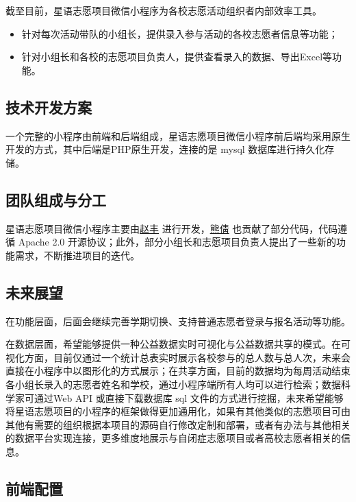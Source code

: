 \documentclass[]{ctexart}
\begin{document}
截至目前，星语志愿项目微信小程序为各校志愿活动组织者内部效率工具。

\begin{itemize}
\item
  针对每次活动带队的小组长，提供录入参与活动的各校志愿者信息等功能；
\item
  针对小组长和各校的志愿项目负责人，提供查看录入的数据、导出Excel等功能。
\end{itemize}

\subsection{技术开发方案}\label{ux6280ux672fux5f00ux53d1ux65b9ux6848}

一个完整的小程序由前端和后端组成，星语志愿项目微信小程序前后端均采用原生开发的方式，其中后端是PHP原生开发，连接的是
mysql 数据库进行持久化存储。

\subsection{团队组成与分工}\label{ux56e2ux961fux7ec4ux6210ux4e0eux5206ux5de5}

星语志愿项目微信小程序主要由\href{https://github.com/zhaofeng-shu33}{赵丰}
进行开发，\href{https://github.com/Prisicilla}{熊倩}
也贡献了部分代码，代码遵循 Apache 2.0 开源协议；此外，部分小组长和志愿项目负责人提出了一些新的功能需求，不断推进项目的迭代。

\subsection{未来展望}
在功能层面，后面会继续完善学期切换、支持普通志愿者登录与报名活动等功能。

在数据层面，希望能够提供一种公益数据实时可视化与公益数据共享的模式。在可视化方面，目前仅通过一个统计总表实时展示各校参与的总人数与总人次，未来会直接在小程序中以图形化的方式展示；在共享方面，目前的数据均为每周活动结束各小组长录入的志愿者姓名和学校，通过小程序端所有人均可以进行检索；数据科学家可通过Web API 或直接下载数据库 sql 文件的方式进行挖掘，未来希望能够将星语志愿项目的小程序的框架做得更加通用化，如果有其他类似的志愿项目可由其他有需要的组织根据本项目的源码自行修改定制和部署，或者有办法与其他相关的数据平台实现连接，更多维度地展示与自闭症志愿项目或者高校志愿者相关的信息。

\subsection{前端配置}\label{ux524dux7aefux914dux7f6e}
\end{document}
